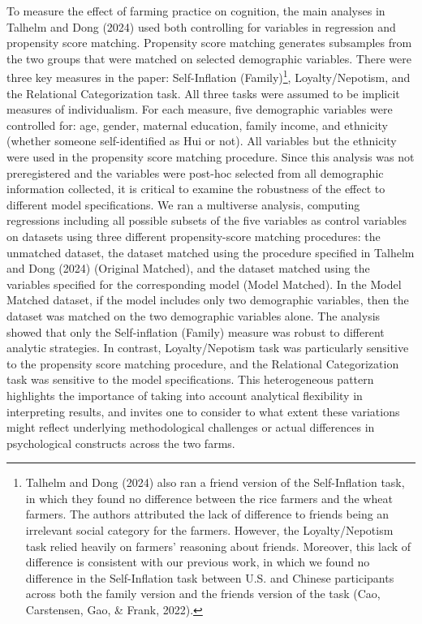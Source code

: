 \documentclass[
  man]{apa6}
\begin{document}
To measure the effect of farming practice on cognition, the main analyses in Talhelm and Dong (2024) used both controlling for variables in regression and propensity score matching. Propensity score matching generates subsamples from the two groups that were matched on selected demographic variables. There were three key measures in the paper: Self-Inflation (Family)\footnote{Talhelm and Dong (2024) also ran a friend version of the Self-Inflation task, in which they found no difference between the rice farmers and the wheat farmers. The authors attributed the lack of difference to friends being an irrelevant social category for the farmers. However, the Loyalty/Nepotism task relied heavily on farmers' reasoning about friends. Moreover, this lack of difference is consistent with our previous work, in which we found no difference in the Self-Inflation task between U.S. and Chinese participants across both the family version and the friends version of the task (Cao, Carstensen, Gao, \& Frank, 2022).}, Loyalty/Nepotism, and the Relational Categorization task. All three tasks were assumed to be implicit measures of individualism. For each measure, five demographic variables were controlled for: age, gender, maternal education, family income, and ethnicity (whether someone self-identified as Hui or not). All variables but the ethnicity were used in the propensity score matching procedure. Since this analysis was not preregistered and the variables were post-hoc selected from all demographic information collected, it is critical to examine the robustness of the effect to different model specifications. We ran a multiverse analysis, computing regressions including all possible subsets of the five variables as control variables on datasets using three different propensity-score matching procedures: the unmatched dataset, the dataset matched using the procedure specified in Talhelm and Dong (2024) (Original Matched), and the dataset matched using the variables specified for the corresponding model (Model Matched). In the Model Matched dataset, if the model includes only two demographic variables, then the dataset was matched on the two demographic variables alone. The analysis showed that only the Self-inflation (Family) measure was robust to different analytic strategies. In contrast, Loyalty/Nepotism task was particularly sensitive to the propensity score matching procedure, and the Relational Categorization task was sensitive to the model specifications. This heterogeneous pattern highlights the importance of taking into account analytical flexibility in interpreting results, and invites one to consider to what extent these variations might reflect underlying methodological challenges or actual differences in psychological constructs across the two farms.
\end{document}
